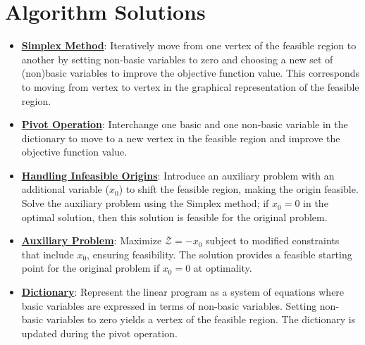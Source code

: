\documentclass{article}%
\begin{document}
\section{Algorithm Solutions}%
\label{sec:AlgorithmSolutions}%
\begin{itemize}[leftmargin=*]%
\item \href{https://www.math.purdue.edu/~yipn/421/2024-08-27-ExSimplex.pdf#page=6}{\textbf{Simplex Method}}: Iteratively move from one vertex of the feasible region to another by setting non-basic variables to zero and choosing a new set of (non)basic variables to improve the objective function value. This corresponds to moving from vertex to vertex in the graphical representation of the feasible region.%
\item \href{https://www.math.purdue.edu/~yipn/421/2024-08-27-ExSimplex.pdf#page=9}{\textbf{Pivot Operation}}: Interchange one basic and one non-basic variable in the dictionary to move to a new vertex in the feasible region and improve the objective function value.%
\item \href{https://www.math.purdue.edu/~yipn/421/2024-08-27-ExSimplex.pdf#page=30}{\textbf{Handling Infeasible Origins}}: Introduce an auxiliary problem with an additional variable ($x_0$) to shift the feasible region, making the origin feasible. Solve the auxiliary problem using the Simplex method; if $x_0 = 0$ in the optimal solution, then this solution is feasible for the original problem.%
\item \href{https://www.math.purdue.edu/~yipn/421/2024-08-27-ExSimplex.pdf#page=32}{\textbf{Auxiliary Problem}}: Maximize $\overline{\mathcal{Z}} = -x_0$ subject to modified constraints that include $x_0$, ensuring feasibility. The solution provides a feasible starting point for the original problem if $x_0 = 0$ at optimality.%
\item \href{https://www.math.purdue.edu/~yipn/421/2024-08-27-ExSimplex.pdf#page=26}{\textbf{Dictionary}}: Represent the linear program as a system of equations where basic variables are expressed in terms of non-basic variables. Setting non-basic variables to zero yields a vertex of the feasible region. The dictionary is updated during the pivot operation.%
\end{itemize}

%
\end{document}
